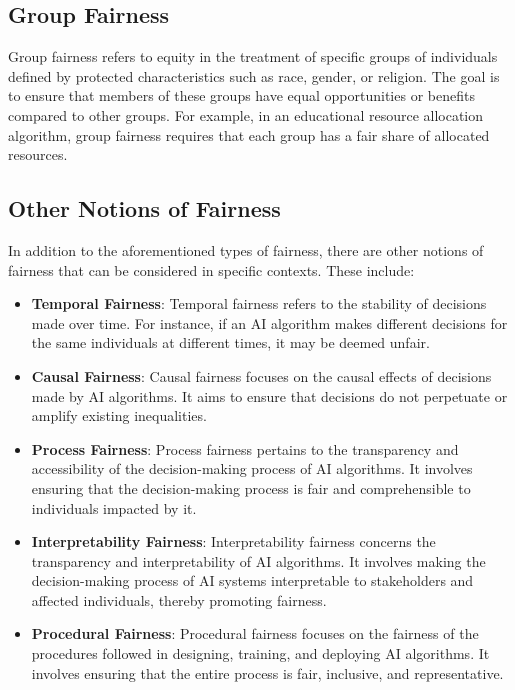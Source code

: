 \documentclass[12pt,a4paper,openright,twoside]{book}
\begin{document}
\subsection{Group Fairness}
Group fairness refers to equity in the treatment of specific groups of individuals defined by protected characteristics such as race, gender, or religion. The goal is to ensure that members of these groups have equal opportunities or benefits compared to other groups. For example, in an educational resource allocation algorithm, group fairness requires that each group has a fair share of allocated resources.

\subsection{Other Notions of Fairness}
In addition to the aforementioned types of fairness, there are other notions of fairness that can be considered in specific contexts. These include:

\begin{itemize}
    \item \textbf{Temporal Fairness}: Temporal fairness refers to the stability of decisions made over time. For instance, if an AI algorithm makes different decisions for the same individuals at different times, it may be deemed unfair.

    \item \textbf{Causal Fairness}: Causal fairness focuses on the causal effects of decisions made by AI algorithms. It aims to ensure that decisions do not perpetuate or amplify existing inequalities.

    \item \textbf{Process Fairness}: Process fairness pertains to the transparency and accessibility of the decision-making process of AI algorithms. It involves ensuring that the decision-making process is fair and comprehensible to individuals impacted by it.

    \item \textbf{Interpretability Fairness}: Interpretability fairness concerns the transparency and interpretability of AI algorithms. It involves making the decision-making process of AI systems interpretable to stakeholders and affected individuals, thereby promoting fairness.

    \item \textbf{Procedural Fairness}: Procedural fairness focuses on the fairness of the procedures followed in designing, training, and deploying AI algorithms. It involves ensuring that the entire process is fair, inclusive, and representative.

\end{itemize}
\end{document}
